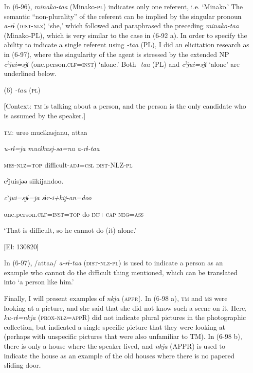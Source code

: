 In (6-96), \textit{minako-taa} (Minako-\textsc{pl}) indicates only one referent, i.e. ‘Minako.’ The semantic “non-plurality” of the referent can be implied by the singular pronoun \textit{a-rɨ} (\textsc{dist}-\textsc{nlz}) ‘she,’ which followed and paraphrased the preceding \textit{minako-taa} (Minako-PL), which is very similar to the case in (6-92 a). In order to specify the ability to indicate a single referent using \textit{{}-taa} (PL), I did an elicitation research as in (6-97), where the singularity of the agent is stressed by the extended NP \textit{cˀjui=sjɨ} (one.person.\textsc{clf}=\textsc{inst}) ‘alone.’ Both \textit{{}-taa} (PL) and \textit{cˀjui=sjɨ} ‘alone’ are underlined below.

(6)  \textit{{}-taa} (\textsc{pl})

  [Context: \textsc{tm} is talking about a person, and the person is the only candidate who is assumed by the speaker.]

  \textsc{tm}:  urəə  mucɨkasjanu,  attaa

    \textit{u-rɨ=ja}  \textit{mucɨkasj-sa=nu}  \textit{a-rɨ-taa}

    \textsc{mes}-\textsc{nlz}=\textsc{top}  difficult-\textsc{adj}=\textsc{csl}  \textsc{dist}-NLZ-\textsc{pl}

    cˀjuisjəə  siikijandoo.

    \textit{cˀjui=sjɨ=ja}  \textit{sɨr-i+kij-an=doo}

    one.person.\textsc{clf}=\textsc{inst}=\textsc{top}  do-\textsc{inf}+\textsc{cap}-\textsc{neg}=\textsc{ass}

    ‘That is difficult, so he cannot do (it) alone.’

    [El: 130820]

In (6-97), /attaa/ \textit{a-rɨ-taa} (\textsc{dist}-\textsc{nlz}-\textsc{pl}) is used to indicate a person as an example who cannot do the difficult thing mentioned, which can be translated into ‘a person like him.’

  Finally, I will present examples of \textit{nkja} (\textsc{appr}). In (6-98 a), \textsc{tm} and \textsc{ms} were looking at a picture, and she said that she did not know such a scene on it. Here, \textit{ku-rɨ=nkja} (\textsc{prox}-\textsc{nlz}=\textsc{app}R) did not indicate plural pictures in the photographic collection, but indicated a single specific picture that they were looking at (perhaps with unspecific pictures that were also unfamiliar to TM). In (6-98 b), there is only a house where the speaker lived, and \textit{nkja} (APPR) is used to indicate the house as an example of the old houses where there is no papered sliding door.

